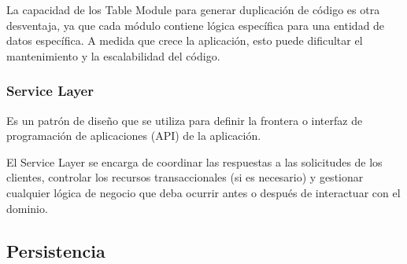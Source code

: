 \documentclass{article}
\begin{document}
		La capacidad de los Table Module para generar duplicación de código es otra desventaja, ya que cada módulo contiene lógica específica para una entidad de datos específica. A medida que crece la aplicación, esto puede dificultar el mantenimiento y la escalabilidad del código.
		
		\subsubsection{Service Layer}
		Es un patrón de diseño que se utiliza para definir la frontera o interfaz de programación de aplicaciones (API) de la aplicación.
		
		El Service Layer se encarga de coordinar las respuestas a las solicitudes de los clientes, controlar los recursos transaccionales (si es necesario) y gestionar cualquier lógica de negocio que deba ocurrir antes o después de interactuar con el dominio.
		
		\subsection{Persistencia}
\end{document}
